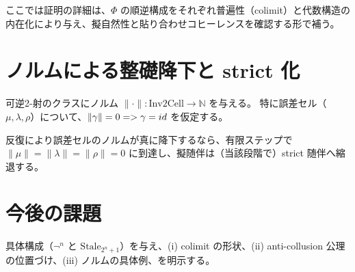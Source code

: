 \documentclass[a4paper,11pt]{article}
\begin{document}
\begin{remark}
ここでは証明の詳細は、$\Phi$ の順逆構成をそれぞれ普遍性（colimit）と代数構造の内在化により与え、擬自然性と貼り合わせコヒーレンスを確認する形で補う。
\end{remark}

\section{ノルムによる整礎降下と strict 化}
\begin{definition}[離散ノルム]
可逆2-射のクラスにノルム $\|\cdot\|:\mathrm{Inv2Cell}\to\mathbb{N}$ を与える。
特に誤差セル（$\mu,\lambda,\rho$）について、$\|\gamma\|=0=> \gamma=id$ を仮定する。
\end{definition}

\begin{theorem}
反復により誤差セルのノルムが真に降下するなら、有限ステップで $\|\mu\|=\|\lambda\|=\|\rho\|=0$ に到達し、擬随伴は（当該段階で）strict 随伴へ縮退する。
\end{theorem}

\section{今後の課題}
具体構成（$\neg^n$ と $\mathrm{Stale}_{2^n+1}$）を与え、(i) colimit の形状、(ii) anti-collusion 公理の位置づけ、(iii) ノルムの具体例、を明示する。
\end{document}
